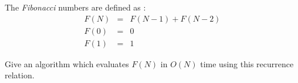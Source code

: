 The {\em Fibonacci} numbers are defined as :
\begin{eqnarray}
F(N) & = & F(N-1)+F(N-2) \nonumber  \\
F(0) & = & 0 \nonumber  \\
F(1) & = & 1 \nonumber  

\end{eqnarray}

Give an algorithm which evaluates $F(N)$ in $O(N)$ time using this
recurrence relation. 
